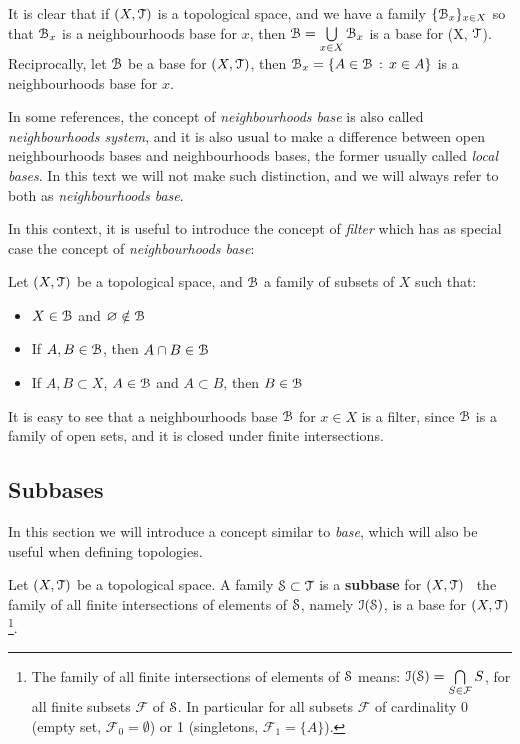 It is clear that if $(X,\T)$ is a topological space, and we have a family
$\{\B_x\}_{x\in X}$ so that $\B_x$ is a neighbourhoods base for $x$, then
$\B=\bigcup\limits_{x\in X}\B_x$ is a base for (X, $\T$).
Reciprocally, let $\B$ be a base for $(X, \T)$, then $\B_x = \setdef{A\in\B}{x\in A}$ is
a neighbourhoods base for $x$.

\begin{remark}
	In some references, the concept of \emph{neighbourhoods base} is also called
	\emph{neighbourhoods system}, and it is also usual to make a difference between
	open neighbourhoods bases and neighbourhoods bases, the former usually called
	\emph{local bases}. In this text we will not make such distinction, and we will
	always refer to both as \emph{neighbourhoods base}.
\end{remark}

In this context, it is useful to introduce the concept of \emph{filter}
which has as special case the concept of \emph{neighbourhoods base}:

\begin{definition}
	\label{def:filter}
	Let $(X, \T)$ be a topological space, and $\B$ a family of subsets of $X$ such that:
	\begin{itemize}
		\item $X\in\B$ and $\emptyset\notin\B$
		\item If $A, B\in\B$, then $A\cap B\in\B$
		\item If $A,B\subset X$, $A\in\B$ and $A\subset B$, then $B\in\B$
	\end{itemize}
\end{definition}

It is easy to see that a neighbourhoods base $\B$ for $x\in X$ is a filter, since
$\B$ is a family of open sets, and it is closed under finite intersections.


\subsection{Subbases}\label{subsec:subbases}

In this section we will introduce a concept similar to \emph{base}, which will also be
useful when defining topologies.

\begin{definition}
\label{def:subbase}
	Let $(X, \T)$ be a topological space.
	A family $\S\subset \T$ is a \textbf{subbase}	for $(X, \T)$ \iff\ the family of all finite intersections
	of elements of $\S$, namely	$\I(\S)$, is a base for $(X, \T)$\footnote{The family of all finite intersections of
	elements of $\S$ means: $\I(\S) = \bigcap\limits_{S\in\mathcal{F}} S$, for all finite subsets
	$\mathcal{F}$ of $\S$. In particular for all subsets $\mathcal{F}$ of cardinality
	0 (empty set, $\mathcal{F}_0=\emptyset$) or 1 (singletons, $\mathcal{F}_1=\{A\}$).}.
\end{definition}

